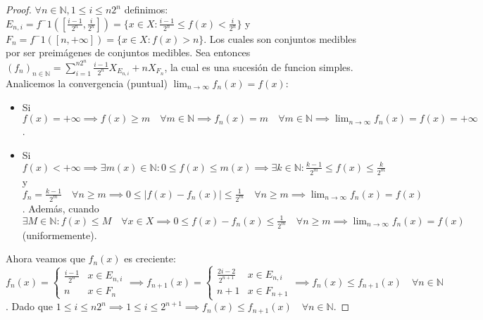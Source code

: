 \begin{proof}
    $\forall n \in \mathbb{N}, 1 \leq i \leq n2^n$ definimos:
    $E_{n, i} = f^-1([\frac{i-1}{2^n}, \frac{i}{2^n}]) = \{x \in X : \frac{i-1}{2^n} \leq f(x) < \frac{i}{2^n}\}$ y $F_n = f^-1([n, +\infty]) = \{x \in X : f(x) > n\}$.
    Los cuales son conjuntos medibles por ser preimágenes de conjuntos medibles. Sea entonces $(f_n)_{n\in\mathbb{N}} = \sum_{i = 1}^{n2^n}\frac{i-1}{2^n}X_{E_{n, i}} + nX_{F_n}$, la cual es una sucesión de funcion simples.
    Analicemos la convergencia (puntual) $\lim_{n \to \infty}f_n(x) = f(x)$:
    \begin{itemize}
        \item Si $f(x) = +\infty \implies f(x) \geq m \quad \forall m \in \mathbb{N} \implies
                  f_n(x) = m \quad \forall m \in \mathbb{N} \implies \lim_{n \to \infty}f_n(x) =
                  f(x) = +\infty$.
        \item Si $f(x) < +\infty \implies \exists m(x) \in \mathbb{N} : 0 \leq f(x) \leq m(x)
                  \implies \exists k \in \mathbb{N} : \frac{k-1}{2^m} \leq f(x) \leq
                  \frac{k}{2^m}$ y $f_n = \frac{k-1}{2^m} \quad \forall n \geq m \implies 0 \leq
                  |f(x) - f_n(x)| \leq \frac{1}{2^m} \quad \forall n \geq m \implies \lim_{n \to
                      \infty}f_n(x) = f(x)$. Además, cuando $\exists M \in \mathbb{N} : f(x) \leq M
                  \quad \forall x \in X \implies 0 \leq f(x) - f_n(x) \leq \frac{1}{2^m} \quad
                  \forall n \geq m \implies \lim_{n \to \infty}f_n(x) = f(x)$ (uniformemente).
    \end{itemize}
    Ahora veamos que $f_n(x)$ es creciente:
    $f_n(x) = \begin{cases}
            \frac{i-1}{2^n} & x \in E_{n, i} \\
            n               & x \in F_n
        \end{cases}
        \implies f_{n+1}(x) = \begin{cases}
            \frac{2i-2}{2^{n+1}} & x \in E_{n, i} \\
            n+1                  & x \in F_{n+1}
        \end{cases}
        \implies f_n(x) \leq f_{n+1}(x) \quad \forall n \in \mathbb{N}$. Dado que $1 \leq i \leq n2^n \implies 1 \leq i \leq 2^{n+1} \implies f_n(x) \leq f_{n+1}(x) \quad \forall n \in \mathbb{N}$.
\end{proof}


